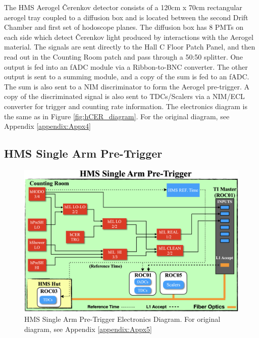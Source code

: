 \documentclass[11pt]{article}
\begin{document}
\indent The HMS Aerogel \v{C}erenkov detector consists of a 120cm x 70cm rectangular aerogel tray coupled to a diffusion box\cite{hms_aero_article} and is located
between the second Drift Chamber and first set of hodoscope planes. The diffusion box has 8 PMTs on each side
which detect \v{C}erenkov light produced by interactions with the Aerogel material. The signals are sent directly to the Hall C Floor Patch Panel, and then
read out in the Counting Room patch and pass through a 50:50 splitter. One output is fed into an fADC module via a Ribbon-to-BNC converter. The other output is
sent to a summing module, and a copy of the sum is fed to an fADC. The sum is also sent to a NIM discriminator to form the Aerogel pre-trigger.
A copy of the discriminated signal is also sent to TDCs/Scalers via a NIM/ECL converter for trigger and counting rate information.
The electronics diagram is the same as in Figure \ref{fig:hCER_diagram}. For the original diagram, see Appendix \ref{appendix:Appx4}

\newpage
\subsection{HMS Single Arm Pre-Trigger}\label{ssec:hms_single_arm_sec}
\begin{figure}[h!]
  \centering
  \includegraphics[scale=0.35]{images/HMS_SingleArm_diagram.png}
  \caption{HMS Single Arm Pre-Trigger Electronics Diagram. For original diagram, see Appendix \ref{appendix:Appx5}}
  \label{fig:HMS_SingleArm_diagram}
\end{figure}
\end{document}
